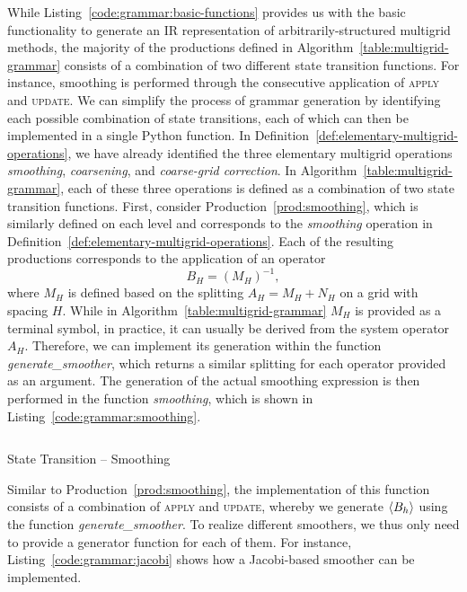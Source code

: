 While Listing~\ref{code:grammar:basic-functions} provides us with the basic functionality to generate an IR representation of arbitrarily-structured multigrid methods, the majority of the productions defined in Algorithm~\ref{table:multigrid-grammar} consists of a combination of two different state transition functions.
For instance, smoothing is performed through the consecutive application of \textsc{apply} and \textsc{update}.
We can simplify the process of grammar generation by identifying each possible combination of state transitions, each of which can then be implemented in a single Python function.
In Definition~\ref{def:elementary-multigrid-operations}, we have already identified the three elementary multigrid operations \emph{smoothing}, \emph{coarsening}, and \emph{coarse-grid correction}.
In Algorithm~\ref{table:multigrid-grammar}, each of these three operations is defined as a combination of two state transition functions.
First, consider Production~\eqref{prod:smoothing}, which is similarly defined on each level and corresponds to the \emph{smoothing} operation in Definition~\ref{def:elementary-multigrid-operations}.
Each of the resulting productions corresponds to the application of an operator
\begin{equation*}
	B_{H} = \left( M_{H} \right)^{-1},
\end{equation*}
where $M_{H}$ is defined based on the splitting $A_{H} = M_{H} + N_{H}$ on a grid with spacing $H$.
While in Algorithm~\ref{table:multigrid-grammar} $M_{H}$ is provided as a terminal symbol, in practice, it can usually be derived from the system operator $A_{H}$.
Therefore, we can implement its generation within the function \emph{generate\_smoother}, which returns a similar splitting for each operator provided as an argument.
The generation of the actual smoothing expression is then performed in the function \emph{smoothing}, which is shown in Listing~\ref{code:grammar:smoothing}.
\begin{listing}
	\inputminted{python}{evostencils/grammar/smoothing.py}
	\caption{State Transition -- Smoothing}
	\label{code:grammar:smoothing}
\end{listing}
Similar to Production~\eqref{prod:smoothing}, the implementation of this function consists of a combination of \textsc{apply} and \textsc{update}, whereby we generate $\langle B_{h} \rangle$ using the function \emph{generate\_smoother}.
To realize different smoothers, we thus only need to provide a generator function for each of them.
For instance, Listing~\ref{code:grammar:jacobi} shows how a Jacobi-based smoother can be implemented.
